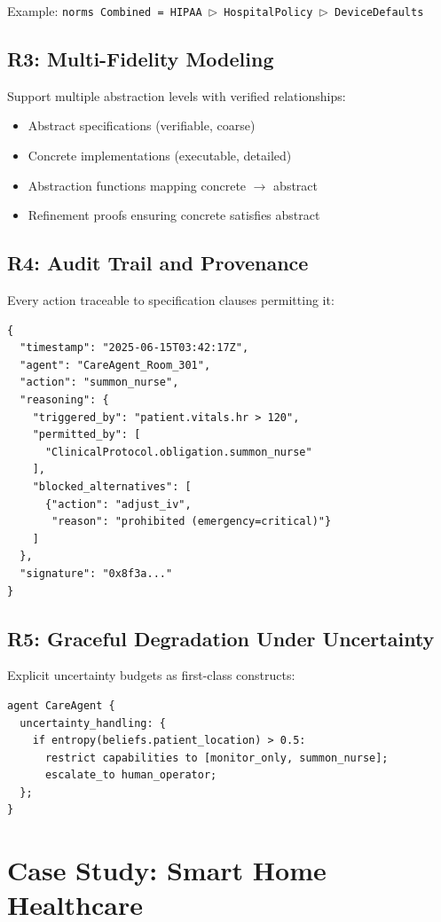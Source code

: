 \documentclass[conference]{IEEEtran}
\begin{document}
Example:
\texttt{norms Combined = HIPAA $\rhd$ HospitalPolicy $\rhd$ DeviceDefaults}

\subsection{R3: Multi-Fidelity Modeling}

Support multiple abstraction levels with verified relationships:
\begin{itemize}
\item Abstract specifications (verifiable, coarse)
\item Concrete implementations (executable, detailed)
\item Abstraction functions mapping concrete $\to$ abstract
\item Refinement proofs ensuring concrete satisfies abstract
\end{itemize}

\subsection{R4: Audit Trail and Provenance}

Every action traceable to specification clauses permitting it:

\begin{lstlisting}
{
  "timestamp": "2025-06-15T03:42:17Z",
  "agent": "CareAgent_Room_301",
  "action": "summon_nurse",
  "reasoning": {
    "triggered_by": "patient.vitals.hr > 120",
    "permitted_by": [
      "ClinicalProtocol.obligation.summon_nurse"
    ],
    "blocked_alternatives": [
      {"action": "adjust_iv",
       "reason": "prohibited (emergency=critical)"}
    ]
  },
  "signature": "0x8f3a..."
}
\end{lstlisting}

\subsection{R5: Graceful Degradation Under Uncertainty}

Explicit uncertainty budgets as first-class constructs:

\begin{lstlisting}
agent CareAgent {
  uncertainty_handling: {
    if entropy(beliefs.patient_location) > 0.5:
      restrict capabilities to [monitor_only, summon_nurse];
      escalate_to human_operator;
  };
}
\end{lstlisting}

\section{Case Study: Smart Home Healthcare}
\label{sec:case-study}
\end{document}
